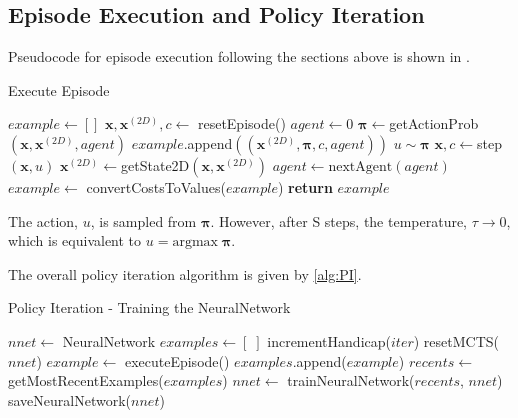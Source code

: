 \documentclass[../main.tex]{subfiles}
\begin{document}
\subsection{Episode Execution and Policy Iteration}

Pseudocode for episode execution following the sections above is shown in .

\begin{algorithm}
   \caption{Execute Episode}
   \label{alg:executeEpisode}
   \begin{algorithmic}[1]
      \State $example \leftarrow []$
      \State $\boldsymbol{x}, \boldsymbol{x}^{(2D)}, c \leftarrow$ resetEpisode()
      \State $agent\leftarrow 0$
      \Repeat
         \State $\boldsymbol{\pi} \leftarrow $getActionProb$(\boldsymbol{x}, \boldsymbol{x}^{(2D)}, agent)$
         \State $example$.append$((\boldsymbol{x}^{(2D)}, \boldsymbol{\pi}, c, agent))$
         \State $u \sim \boldsymbol{\pi}$
         \State $\boldsymbol{x}, c \leftarrow $step$(\boldsymbol{x}, u)$
         \State $\boldsymbol{x}^{(2D)} \leftarrow $getState2D$(\boldsymbol{x}, \boldsymbol{x}^{(2D)})$
         \State $agent \leftarrow \text{nextAgent}(agent)$
      \State $example \leftarrow$ convertCostsToValues($example$)
      \State \textbf{return} $example$
      \EndFunction
   \end{algorithmic}
\end{algorithm}

The action, $u$, is sampled from $\boldsymbol{\pi}$. However, after S steps, the temperature, $\tau \rightarrow 0$, which is equivalent to  $u = \text{argmax}\;\boldsymbol{\pi}$.

The overall policy iteration algorithm is given by \cref{alg:PI}.

\begin{algorithm}
   \label{alg:PI}
   \caption{Policy Iteration - Training the NeuralNetwork}
   \begin{algorithmic}[1]
      \State $nnet \leftarrow$ NeuralNetwork
      \State $examples \leftarrow [\;]$
      \State incrementHandicap($iter$)
         \State resetMCTS($nnet$)
         \State $example \leftarrow$ executeEpisode()
         \State $examples$.append($example$)    
         \EndFor
      \State $recents \leftarrow$ getMostRecentExamples($examples$)
      \State $nnet \leftarrow$ trainNeuralNetwork($recents$, $nnet$)
      \State saveNeuralNetwork($nnet$)
      \EndFor
      \EndFunction
   \end{algorithmic}
\end{algorithm}
\end{document}
